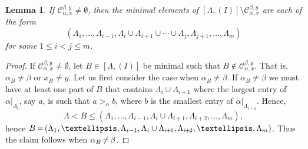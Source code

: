 \documentclass[10pt]{amsart}
\newtheorem{lemma}[theorem]{Lemma}
\theoremstyle{definition}
\newcommand*{\Mk}{\mkern -2mu}
\begin{document}
\begin{lemma}\label{le:upperideal} If $ \mathcal{C}_{\alpha,x}^{\beta,y}\ne \emptyset$,
then the minimal elements of $[\Lambda,(I)]\setminus \mathcal{C}_{\alpha,x}^{\beta,y}$ are each of the form
 $$(\Lambda_1,\ldots,\Lambda_{i-1},\Lambda_i\cup\Lambda_{i+1}\cup\cdots\cup \Lambda_j,\Lambda_{j+1},\ldots,\Lambda_m)$$
for some $1\le i<j\le m$.
\end{lemma}
\begin{proof}
If $ \mathcal{C}_{\alpha,x}^{\beta,y}\ne\emptyset$, let $B\in [\Lambda,(I)]$ be minimal such that $B\notin \mathcal{C}_{\alpha,x}^{\beta,y}$.
That is, $\alpha_B\ne \beta$ or $x_B\ne y$. Let us first consider the case when $\alpha_B\ne \beta$. 
If $\alpha_B\ne \beta$ we must have at least one part of $B$ that contains $\Lambda_i\cup\Lambda_{i+1}$ where the largest entry of $\alpha|_{\Lambda_i}$, say $a$, is such that $a>_{\alpha}b$, where $b$ is the smallest entry of $\alpha|_{\Lambda_{i+1}}$. Hence, 
 $$\Lambda<B\le (\Lambda_1,\ldots,\Lambda_{i-1},\Lambda_i\cup\Lambda_{i+1},\Lambda_{i+2},\ldots,\Lambda_m),$$
hence $B\Mk = \Mk (\Lambda_1,\ldots,\Lambda_{i-1},\Lambda_i\cup\Lambda_{i\Mk +\Mk 1},\Lambda_{i\Mk +\Mk 2},\ldots,\Lambda_m)$. Thus the claim follows when $\alpha_B\Mk \neq\Mk \beta$. 



\end{proof}
\end{document}
